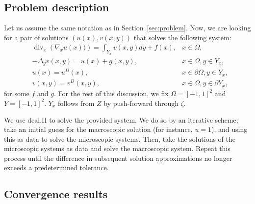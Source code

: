 \documentclass{article}
\renewcommand{\div}{\operatorname{div}}
\begin{document}
\subsection{Problem description}
\label{sub:problem_description}

Let us assume the same notation as in Section~\ref{sec:problem}.
Now, we are looking for a pair of solutions $(u(x),v(x,y))$ that solves the following system:
\begin{align}
    \label{eq:manu_macro}&\div_x\left( \nabla_x {u}(x))\right) = \int_{Y_x} v(x,y) dy + f(x),&x \in \Omega, \\
    \label{eq:manu_micro}&- \Delta_y v(x,y) = u(x) + g(x,y) ,&  x\in \Omega, y \in Y_x, \\
    \label{eq:manu_macro_bc}&{u}(x) = u^D(x), & x\in \partial \Omega,y \in Y_x,\\
    \label{eq:manu_micro_bc}&v(x,y) = v^D(x,y), & x\in \Omega,y \in \partial Y_x,
\end{align}
for some $f$ and $g$.
For the rest of this discussion, we fix $\Omega = [-1,1]^2$ and $Y = [-1,1]^2$.
$Y_x$ follows from $Z$ by push-forward through $\zeta$.

We use deal.II to solve the provided system. We do so by an iterative scheme; take an initial guess for the macroscopic solution (for instance, $u=1$), and using this as data to solve the microscopic systems.
Then, take the solutions of the microscopic systems as data and solve the macroscopic system.
Repeat this process until the difference in subsequent solution approximations no longer exceeds a predetermined tolerance.

\subsection{Convergence results}
\end{document}
